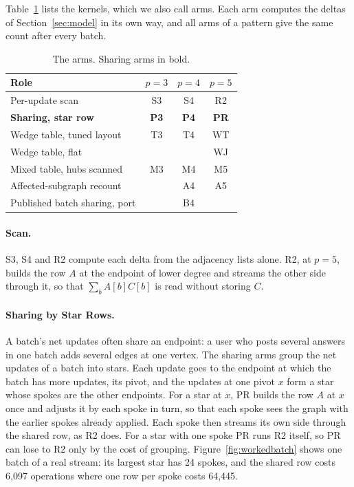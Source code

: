Table~\ref{tab:arms} lists the kernels, which we also call arms.
Each arm computes the deltas of Section~\ref{sec:model} in its own way, and all arms of a pattern give the same count after every batch.

\begin{table}[t]
  \centering
  \begin{tabular}{lccc}
    \hline
    Role & $p = 3$ & $p = 4$ & $p = 5$ \\
    \hline
    Per-update scan & S3 & S4 & R2 \\
    \textbf{Sharing, star row} & \textbf{P3} & \textbf{P4} & \textbf{PR} \\
    Wedge table, tuned layout & T3 & T4 & WT \\
    Wedge table, flat & & & WJ \\
    Mixed table, hubs scanned & M3 & M4 & M5 \\
    Affected-subgraph recount & & A4 & A5 \\
    Published batch sharing, port & & B4 & \\
    \hline
  \end{tabular}
  \caption{The arms. Sharing arms in bold.}
  \label{tab:arms}
\end{table}

\paragraph{Scan.}
S3, S4 and R2 compute each delta from the adjacency lists alone.
R2, at $p = 5$, builds the row $A$ at the endpoint of lower degree and streams the other side through it, so that $\sum_b A[b] C[b]$ is read without storing $C$.

\paragraph{Sharing by Star Rows.}
A batch's net updates often share an endpoint: a user who posts several answers in one batch adds several edges at one vertex.
The sharing arms group the net updates of a batch into stars.
Each update goes to the endpoint at which the batch has more updates, its pivot, and the updates at one pivot $x$ form a star whose spokes are the other endpoints.
For a star at $x$, PR builds the row $A$ at $x$ once and adjusts it by each spoke in turn, so that each spoke sees the graph with the earlier spokes already applied.
Each spoke then streams its own side through the shared row, as R2 does.
For a star with one spoke PR runs R2 itself, so PR can lose to R2 only by the cost of grouping.
Figure~\ref{fig:workedbatch} shows one batch of a real stream: its largest star has 24 spokes, and the shared row costs 6,097 operations where one row per spoke costs 64,445.

